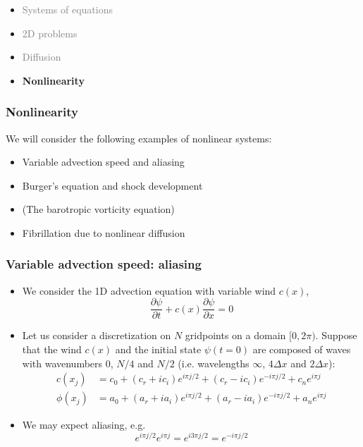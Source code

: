 \documentclass[aspectratio=43,9pt]{beamer}
\begin{document}
%
%
\begin{frame}
	\begin{itemize}
		\item \textcolor{gray}{Systems of equations}
		\item \textcolor{gray}{2D problems}
		\item \textcolor{gray}{Diffusion}
		\item {\bfseries Nonlinearity}
	\end{itemize}
\end{frame}
%
%
\begin{frame}
	\frametitle{Nonlinearity}
	We will consider the following examples of nonlinear systems:\vspace*{4ex}
	\begin{itemize}
		\item Variable advection speed and aliasing\vspace*{2ex}
		\item Burger's equation and shock development\vspace*{2ex}
		\item (The barotropic vorticity equation)\vspace*{2ex}
		\item Fibrillation due to nonlinear diffusion
	\end{itemize}
\end{frame}
%
%
\begin{frame}
	\frametitle{Variable advection speed: aliasing}
	\begin{itemize}
		\item We consider the 1D advection equation with variable wind $c(x)$,
			\begin{equation*}
				\frac{\partial \psi}{\partial t} + c(x) \frac{\partial \psi}{\partial x} = 0
			\end{equation*}
		\item Let us consider a discretization on $N$ gridpoints on a domain $[0,2\pi)$. Suppose that the wind $c(x)$ and the initial state $\psi(t=0)$ are composed of waves with wavenumbers $0$, $N/4$ and $N/2$ (i.e. wavelengths $\infty$, $4\Delta x$ and $2\Delta x$):
			\begin{align*}
				c(x_j) &= c_0 + (c_r+ic_i) e^{i \pi j/2} + (c_r-ic_i) e^{-i \pi j/2} + c_n e^{i \pi j} \\
				\phi(x_j) &= a_0 + (a_r+ia_i) e^{i \pi j/2} + (a_r-ia_i) e^{-i \pi j/2} + a_n e^{i \pi j}
			\end{align*}
		\item We may expect aliasing, e.g.
			\begin{equation*}
				e^{i \pi j /2} e^{i \pi j} = e^{i 3 \pi j /2} = e^{- i \pi j/2}
			\end{equation*}
	\end{itemize}
\end{frame}
\end{document}
